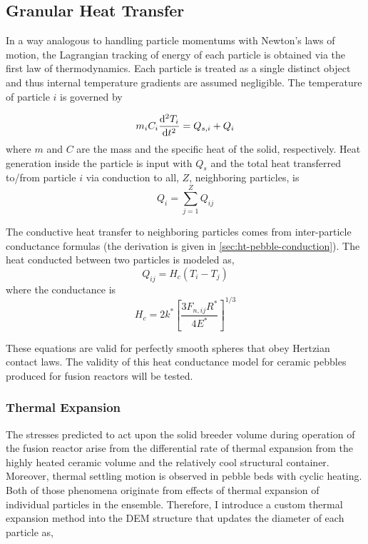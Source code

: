 \subsection{Granular Heat Transfer}\label{sec:dem-heat-transfer}

In a way analogous to handling particle momentums with Newton's laws of motion, the Lagrangian tracking of energy of each particle is obtained via the first law of thermodynamics. Each particle is treated as a single distinct object and thus internal temperature gradients are assumed negligible. The temperature of particle $i$ is governed by

\begin{equation}\label{eq:thermoFirstLaw}
	m_iC_i\frac{\mathrm{d}^2{T_i}}{\mathrm{d}t^2} = Q_{s,i} + Q_{i}
\end{equation}
where $m$ and $C$ are the mass and the specific heat of the solid, respectively. Heat generation inside the particle is input with $Q_{s}$ and the total heat transferred to/from particle $i$ via conduction to all, $Z$, neighboring particles, is
\begin{equation}
	Q_i = \sum_{j=1}^Z Q_{ij}
\end{equation}

The conductive heat transfer to neighboring particles comes from inter-particle conductance formulas (the derivation is given in \cref{sec:ht-pebble-conduction}). The heat conducted between two particles is modeled as,
\begin{equation}
	Q_{ij} = H_c(T_i - T_j)
\end{equation} 
where the conductance is
\begin{equation}\label{eq:dem-conductance}
	H_c= 2k^*\left[\frac{3F_{n,ij}R^*}{4E^*}\right]^{1/3}
\end{equation}

These equations are valid for perfectly smooth spheres that obey Hertzian contact laws. The validity of this heat conductance model for ceramic pebbles produced for fusion reactors will be tested.

\subsubsection{Thermal Expansion}
The stresses predicted to act upon the solid breeder volume during operation of the fusion reactor arise from the differential rate of thermal expansion from the highly heated ceramic volume and the relatively cool structural container. Moreover, thermal settling motion is observed in pebble beds with cyclic heating.\cite{Tanigawa:2010cr, Vargas2007, Chen2009, Divoux2008} Both of those phenomena originate from effects of thermal expansion of individual particles in the ensemble. Therefore, I introduce a custom thermal expansion method into the DEM structure that updates the diameter of each particle as,

